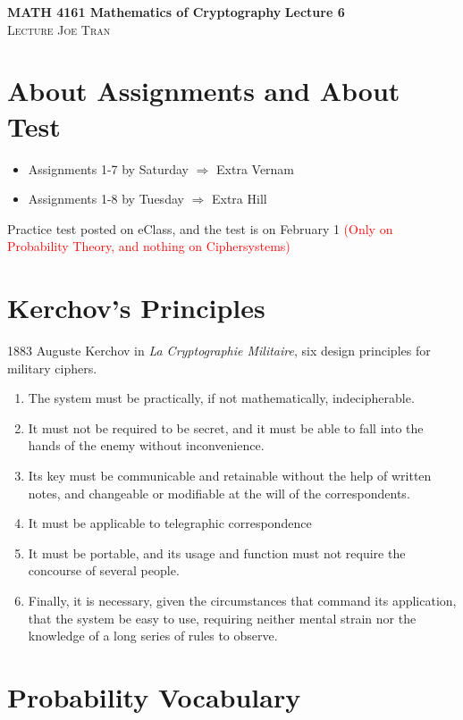 \documentclass[11pt]{article}
\theoremstyle{definition}\newtheorem{definition}{Definition}
\theoremstyle{definition}\newtheorem{question}{Question}
\theoremstyle{definition}\newtheorem*{solution}{Solution}
\theoremstyle{definition}\newtheorem{example}{Example}
\theoremstyle{definition}\newtheorem{notation}{Notation}
\theoremstyle{theorem}\newtheorem{theorem}{Theorem}
\theoremstyle{theorem}\newtheorem{corollary}{Corollary}
\theoremstyle{theorem}\newtheorem{lemma}{Lemma}
\theoremstyle{theorem}\newtheorem{proposition}{Proposition}
\begin{document}
\noindent \textbf{MATH 4161 Mathematics of Cryptography} \hfill \textbf{Lecture 6} \\
\textsc{Lecture} \hfill \textsc{Joe Tran}

\section{About Assignments and About Test}

\begin{itemize}
    \item Assignments 1-7 by Saturday $\Rightarrow$ Extra Vernam
    \item Assignments 1-8 by Tuesday $\Rightarrow$ Extra Hill
\end{itemize}

Practice test posted on eClass, and the test is on February 1 \textcolor{red}{(Only on Probability Theory, and nothing on Ciphersystems)}

\section{Kerchov's Principles}

1883 Auguste Kerchov in \emph{La Cryptographie Militaire}, six design principles for military ciphers.
\begin{enumerate}
    \item The system must be practically, if not mathematically, indecipherable.
    \item It must not be required to be secret, and it must be able to fall into the hands of the enemy without inconvenience.
    \item Its key must be communicable and retainable without the help of written notes, and changeable or modifiable at the will of the correspondents.
    \item It must be applicable to telegraphic correspondence
    \item It must be portable, and its usage and function must not require the concourse of several people.
    \item Finally, it is necessary, given the circumstances that command its application, that the system be easy to use, requiring neither mental strain nor the knowledge of a long series of rules to observe.
\end{enumerate}

\section{Probability Vocabulary}
\end{document}
